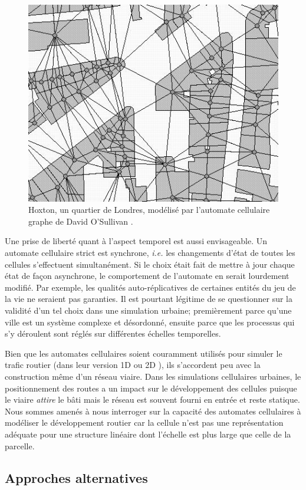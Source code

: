 \documentclass[10pt]{article}
\begin{document}
\begin{figure}[H]
  \centering
  \includegraphics[width=.7\linewidth]{images/gca.png}
  \caption{Hoxton, un quartier de Londres, modélisé par l'automate
    cellulaire graphe de David O'Sullivan \cite{O'Sullivan2000}.}
  \label{fig:sullivan}
\end{figure}

Une prise de liberté quant à l'aspect temporel est aussi
envisageable. Un automate cellulaire strict est synchrone,
\textit{i.e.} les changements d'état de toutes les cellules
s'effectuent simultanément. Si le choix était fait de mettre à jour
chaque état de façon asynchrone, le comportement de l'automate en
serait lourdement modifié. Par exemple, les qualités auto-réplicatives
de certaines entités du jeu de la vie ne seraient pas garanties. Il
est pourtant légitime de se questionner sur la validité d'un tel choix
dans une simulation urbaine; premièrement parce qu'une ville est un
système complexe et désordonné, ensuite parce que les processus qui
s'y déroulent sont réglés sur différentes échelles temporelles.

Bien que les automates cellulaires soient couramment utilisés pour
simuler le trafic routier (dans leur version 1D ou 2D
\cite{Queloz1996}), ils s'accordent peu avec la construction même d'un
réseau viaire. Dans les simulations cellulaires urbaines, le
positionnement des routes a un impact sur le développement des
cellules puisque le viaire \textit{attire} le bâti mais le réseau est
souvent fourni en entrée et reste statique. Nous sommes amenés à nous
interroger sur la capacité des automates cellulaires à modéliser le
développement routier car la cellule n'est pas une représentation
adéquate pour une structure linéaire dont l'échelle est plus large que
celle de la parcelle.

\subsection{Approches alternatives}
\end{document}
